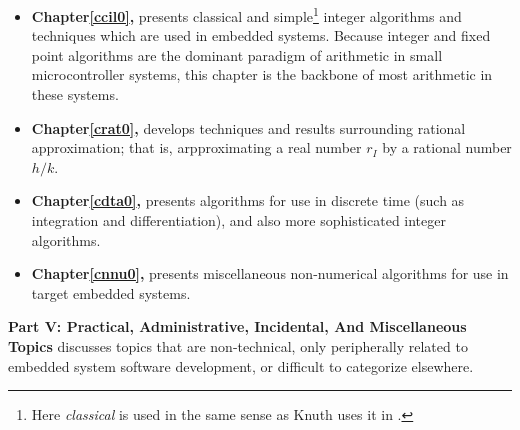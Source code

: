 \documentclass[letterpaper,10pt,titlepage]{custbook}
\begin{document}
\begin{itemize}
\item \textbf{Chapter\;\ref{ccil0}, \ccilzerotitle{}} presents
      classical and simple\footnote{Here \emph{classical} is used
	  in the same sense as Knuth uses it in \cite[p. 265]{bibref:b:knuthclassic2ndedvol2}.} 
	  integer algorithms and techniques which 
      are used in embedded systems.  Because integer and fixed point algorithms
      are the dominant paradigm of arithmetic in small microcontroller
      systems, this chapter is the backbone of most arithmetic in these systems.

\item \textbf{Chapter\;\ref{crat0}, \cratzerotitle{}} develops techniques
      and results surrounding rational approximation; that is, arpproximating a real number
      $r_I$ by a rational number $h/k$.

\item \textbf{Chapter\;\ref{cdta0}, \cdtazerotitle{}} presents algorithms
      for use in discrete time (such as integration and differentiation),
      and also more sophisticated integer algorithms.

\item \textbf{Chapter\;\ref{cnnu0}, \cnnuzerotitle{}} presents miscellaneous
      non-numerical algorithms for use in target embedded systems.
\end{itemize}


\textbf{Part V:  Practical, Administrative, Incidental, And Miscellaneous Topics}
discusses topics that are non-technical, only peripherally related to embedded system
software development,
or difficult to categorize elsewhere.
\end{document}
